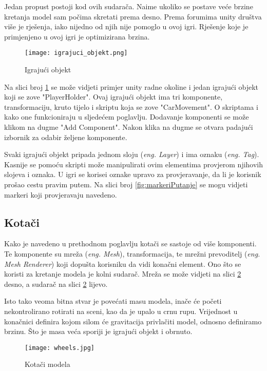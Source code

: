 Jedan propust postoji kod ovih sudarača. Naime ukoliko se postave veće brzine kretanja model sam počima skretati prema desno. Prema forumima unity društva više je rješenja, iako nijedno od njih nije pomoglo u ovoj igri. Rješenje koje je primjenjeno u ovoj igri je optimizirana brzina.

\begin{figure}[h]
	\texttt{[image: igrajuci\_objekt.png]}
	\centering
	\caption{Igrajući objekt}
	\label{fig:igrajuciobjekt}
\end{figure}
\newpage
Na slici broj \ref{fig:igrajuciobjekt} se može vidjeti primjer unity radne okoline i jedan igrajući objekt koji se zove "PlayerHolder". Ovaj igrajući objekt ima tri komponente, transformaciju, kruto tijelo i skriptu koja se zove "CarMovement". O skriptama i kako one funkcioniraju u sljedećem poglavlju. Dodavanje komponenti se može klikom na dugme "Add Component". Nakon klika na dugme se otvara padajući izbornik za odabir željene komponente. \par
Svaki igrajući objekt pripada jednom sloju (\emph{eng. Layer}) i ima oznaku (\emph{eng. Tag}). Kasnije se pomoću skripti može manipulirati ovim elementima provjerom njihovih slojeva i oznaka. U igri se korisei oznake upravo za provjeravanje, da li je korisnik prošao cestu pravim putem. Na slici broj \ref{fig:markeriPutanje} se mogu vidjeti markeri koji provjeravaju navedeno.

\subsection{Kotači}
Kako je navedeno u prethodnom poglavlju kotači se sastoje od više komponenti. Te komponente su mreža (\emph{eng. Mesh}), transformacija, te mrežni prevoditelj (\emph{eng. Mesh Renderer}) koji dopušta korisniku da vidi konačni element. Ono što se koristi za kretanje modela je kolni sudarač. Mreža se može vidjeti na slici \ref{fig:kotaci} desno, a sudarač na slici \ref{fig:kotaci} lijevo. \par
Isto tako veoma bitna stvar je povećati masu modela, inače će početi nekontrolirano rotirati na sceni, kao da je upalo u crnu rupu. Vrijednost u konačnici definira kojom silom će gravitacija privlačiti model, odnosno definiramo brzinu. Što je masa veća sporiji je igrajući objekt i obrnuto.

\begin{figure}[h]
	\texttt{[image: wheels.jpg]}
	\centering
	\caption{Kotači modela}
	\label{fig:kotaci}
\end{figure}

